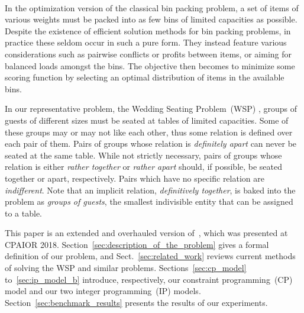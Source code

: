 \documentclass{llncs}
\begin{document}
%

\paragraph{}In the optimization version of the classical bin packing problem, a set of items of various weights must be packed into as few bins of limited capacities as possible. Despite the existence of efficient solution methods for bin packing problems, in practice these seldom occur in such a pure form. They instead feature various considerations such as pairwise conflicts or profits between items, or aiming for balanced loads amongst the bins. The objective then becomes to minimize some scoring function by selecting an optimal distribution of items in the available bins.

In our representative problem, the Wedding Seating Problem~(WSP) \cite{Lewis2013}, groups of guests of different sizes must be seated at tables of limited capacities. Some of these groups may or may not like each other, thus some relation is defined over each pair of them. Pairs of groups whose relation is \emph{definitely apart} can never be seated at the same table. While not strictly necessary, pairs of groups whose relation is either \emph{rather together} or \emph{rather apart} should, if possible, be seated together or apart, respectively. Pairs which have no specific relation are \emph{indifferent}. Note that an implicit relation, \emph{definitively together}, is baked into the problem as \emph{groups of guests}, the smallest indivisible entity that can be assigned to a table.

This paper is an extended and overhauled version of~\cite{Olivier2018}, which was presented at CPAIOR 2018. Section~\ref{sec:description_of_the_problem} gives a formal definition of our problem, and Sect.~\ref{sec:related_work} reviews current methods of solving the WSP and similar problems. Sections~\ref{sec:cp_model} to~\ref{sec:ip_model_b} introduce, respectively, our constraint programming~(CP) model and our two integer programming~(IP) models. Section~\ref{sec:benchmark_results} presents the results of our experiments.


\end{document}

